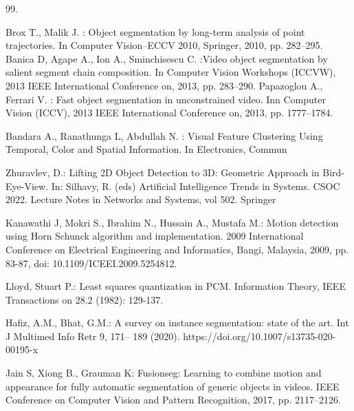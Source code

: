 % 
%
%
% 
% 
%

\begin{thebibliography}{99.}%
%
%


Brox T., Malik J. : Object segmentation by long-term analysis of
point trajectories. In Computer Vision–ECCV 2010, Springer, 2010, pp.
282–295.
Banica D, Agape A., Ion A., Sminchisescu C. :Video object
segmentation by salient segment chain composition. In Computer
Vision Workshops (ICCVW), 2013 IEEE International Conference on,
2013, pp. 283–290.
Papazoglou A., Ferrari V. : Fast object segmentation in
unconstrained video. Inn Computer Vision (ICCV), 2013 IEEE
International Conference on, 2013, pp. 1777–1784.

Bandara A., Ranathunga L, Abdullah N. : Visual Feature
Clustering Using Temporal, Color and Spatial Information. In
Electronics, Commun

Zhuravlev, D.: Lifting 2D Object Detection to 3D: Geometric Approach in Bird-Eye-View. In: Silhavy, R. (eds) Artificial Intelligence Trends in Systems. CSOC 2022. Lecture Notes in Networks and Systems, vol 502. Springer

 Kanawathi J, Mokri S., Ibrahim N., Hussain A., Mustafa M.: Motion detection using Horn Schunck algorithm and implementation. 2009 International Conference on Electrical Engineering and Informatics, Bangi, Malaysia, 2009, pp. 83-87, doi: 10.1109/ICEEI.2009.5254812.

Lloyd, Stuart P.: Least squares quantization in PCM. Information Theory, IEEE Transactions on 28.2 (1982): 129-137.

Hafiz, A.M., Bhat, G.M.: A survey on instance segmentation: state of the art. Int J Multimed Info Retr 9, 171–
189 (2020). https://doi.org/10.1007/s13735-020-00195-x

Jain S, Xiong B., Grauman K: Fusionseg: Learning to combine motion and appearance for fully automatic segmentation of generic objects in videos. IEEE Conference on Computer Vision and Pattern Recognition, 2017, pp. 2117–2126.


\end{thebibliography}
